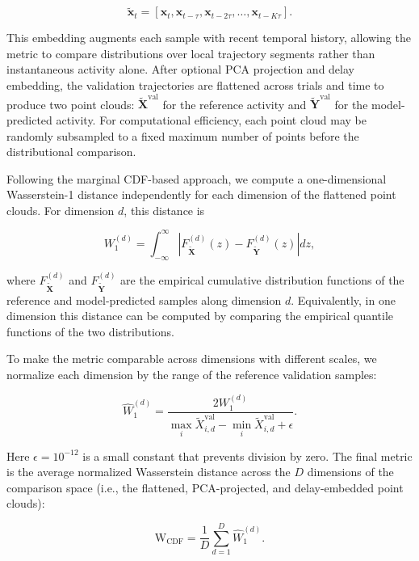 \documentclass{article}
\begin{document}
\begin{equation}
\tilde{\mathbf{x}}_t =
\left[
\mathbf{x}_t,
\mathbf{x}_{t-\tau},
\mathbf{x}_{t-2\tau},
\ldots,
\mathbf{x}_{t-K\tau}
\right].
\end{equation}

This embedding augments each sample with recent temporal history, allowing the metric to compare distributions over local trajectory segments rather than instantaneous activity alone. After optional PCA projection and delay embedding, the validation trajectories are flattened across trials and time to produce two point clouds:
$\tilde{\mathbf{X}}^{\mathrm{val}}$ for the reference activity and
$\tilde{\mathbf{Y}}^{\mathrm{val}}$ for the model-predicted activity. For computational efficiency, each point cloud may be randomly subsampled to a fixed maximum number of points before the distributional comparison.

Following the marginal CDF-based approach, we compute a one-dimensional Wasserstein-1 distance independently for each dimension of the flattened point clouds. For dimension $d$, this distance is

\begin{equation}
W_1^{(d)} =
\int_{-\infty}^{\infty}
\left|
F^{(d)}_{\tilde{\mathbf{X}}}(z)
-
F^{(d)}_{\tilde{\mathbf{Y}}}(z)
\right| dz,
\end{equation}

where $F^{(d)}_{\tilde{\mathbf{X}}}$ and $F^{(d)}_{\tilde{\mathbf{Y}}}$ are the empirical cumulative distribution functions of the reference and model-predicted samples along dimension $d$. Equivalently, in one dimension this distance can be computed by comparing the empirical quantile functions of the two distributions.

To make the metric comparable across dimensions with different scales, we normalize each dimension by the range of the reference validation samples:

\begin{equation}
\hat{W}_1^{(d)} =
\frac{2 W_1^{(d)}}{
\max_i \tilde{X}^{\mathrm{val}}_{i,d}
-
\min_i \tilde{X}^{\mathrm{val}}_{i,d}
+
\epsilon
}.
\end{equation}

Here $\epsilon = 10^{-12}$ is a small constant that prevents division by zero. The final metric is the average normalized Wasserstein distance across the $D$ dimensions of the comparison space (i.e., the flattened, PCA-projected, and delay-embedded point clouds):

\begin{equation}
\mathrm{W}_{\mathrm{CDF}} =
\frac{1}{D}
\sum_{d=1}^{D}
\hat{W}_1^{(d)}.
\end{equation}
\end{document}
